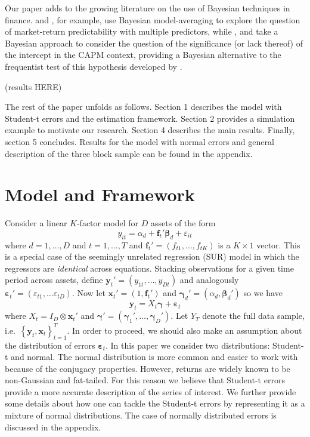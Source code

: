 \documentclass[12pt]{article}
\begin{document}
  Our paper adds to the growing literature on the use of Bayesian techniques in finance. \cite{avramov2002stock} and \cite{cremers2002stock}, for example, use Bayesian model-averaging to explore the question of market-return predictability with multiple predictors, while \cite{shanken1987bayesian}, \cite{harvey1990bayesian} and \cite{avramov2006exact} take a Bayesian approach to consider the question of the significance (or lack thereof) of the intercept in the CAPM context, providing a Bayesian alternative to the frequentist test of this hypothesis developed by \cite{gibbons1989test}.

 (results HERE)

 The rest of the paper unfolds as follows. Section 1 describes the model with Student-t errors and the estimation framework. Section 2 provides a simulation example to motivate our research. Section 4 describes the main results. Finally, section 5 concludes. Results for the model with normal errors and general description of the three block sample can be found in the
 appendix.

\section{Model and Framework}
Consider a linear $K$-factor model for $D$ assets of the form
\begin{equation*}
y_{it}=\alpha _{d} + \mathbf{f}_{t}' \boldsymbol{\beta}_d + \varepsilon_{it}
\end{equation*}
where $d = 1, \hdots, D$ and $t = 1, \hdots, T$ and $\mathbf{f}_{t}'=\left(f_{t1}, \hdots,f_{tK}\right)$ is a $K\times1$ vector.
This is a special case of the seemingly unrelated regression (SUR) model in which the regressors are \emph{identical} across equations.
Stacking observations for a given time period across assets, define $\mathbf{y}_t' = (y_{1t}, \hdots, y_{Dt})$ and analogously $\boldsymbol{\varepsilon}_t' = \left( \varepsilon_{t1}, \hdots \varepsilon_{tD} \right)$.
Now let $\mathbf{x}_t' = (1, \mathbf{f}_t')$ and $\boldsymbol{\gamma}_d' = (\alpha_d, \boldsymbol{\beta}_d')$ so we have
\begin{equation*}
\mathbf{y}_t = X_t \boldsymbol{\gamma} + \boldsymbol{\varepsilon}_t
\end{equation*}
where $X_t = I_D \otimes \mathbf{x}_t'$ and $\boldsymbol{\gamma}'= \left( \boldsymbol{\gamma}_1', \hdots, \boldsymbol{\gamma}_D' \right)$. 
Let $Y_T$ denote the full data sample, i.e.\ $\left\{ \mathbf{y}_t, \mathbf{x}_t \right\}_{t=1}^T$.
In order to proceed, we should also make an assumption about the distribution of errors $\boldsymbol{\varepsilon}_{t}$.  In this paper we consider two distributions: Student-t and normal. The normal distribution is more common and easier to work with because of the conjugacy properties. However, returns are widely known to be non-Gaussian and fat-tailed. For this reason we believe that Student-t errors provide a more accurate description of the series of interest. We further provide some details about how one can tackle the Student-t errors by representing it as a mixture of normal distributions. The case of normally distributed errors is discussed in the appendix.
\end{document}
